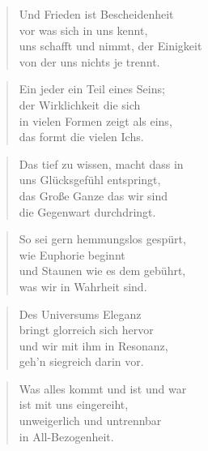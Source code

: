 \documentclass[10pt,a4paper]{article}
\begin{document}
\begin{multicols}{2}
\begin{verse}
Und Frieden ist Bescheidenheit \\
vor was sich in uns kennt, \\
uns schafft und nimmt, der Einigkeit \\
von der uns nichts je trennt. \\
\end{verse}

\begin{verse}
Ein jeder ein Teil eines Seins; \\
der Wirklichkeit die sich \\
in vielen Formen zeigt als eins, \\
das formt die vielen Ichs. \\
\end{verse}

\begin{verse}
Das tief zu wissen, macht dass in \\
uns Glücksgefühl entspringt, \\
das Große Ganze das wir sind \\
die Gegenwart durchdringt. \\
\end{verse}

\begin{verse}
So sei gern hemmungslos gespürt, \\
wie Euphorie beginnt \\
und Staunen wie es dem gebührt, \\
was wir in Wahrheit sind. \\
\end{verse}

\begin{verse}
Des Universums Eleganz \\
bringt glorreich sich hervor \\
und wir mit ihm in Resonanz, \\
geh’n siegreich darin vor. \\
\end{verse}

\begin{verse}
Was alles kommt und ist und war \\
ist mit uns eingereiht, \\
unweigerlich und untrennbar \\
in All-Bezogenheit. \\
\end{verse}


\end{multicols}
\end{document}
